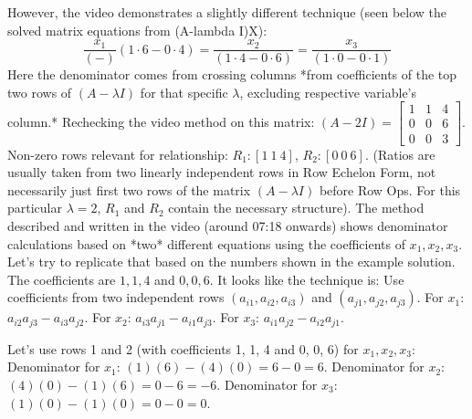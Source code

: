 \documentclass{article}
\begin{document}
However, the video demonstrates a slightly different technique (seen below the solved matrix equations from (A-lambda I)X):
\[ \frac{x_1}{ (-)}(1 \cdot 6 - 0 \cdot 4 ) = \frac{x_2}{(1 \cdot 4 - 0 \cdot 6 )} = \frac{x_3}{ (1 \cdot 0 - 0 \cdot 1 ) } \]
Here the denominator comes from crossing columns *from coefficients of the top two rows of $(A-\lambda I)$ for that specific $\lambda$, excluding respective variable's column.* Rechecking the video method on this matrix:
$(A-2I) = \begin{bmatrix} 1 & 1 & 4 \\ 0 & 0 & 6 \\ 0 & 0 & 3 \end{bmatrix}$. Non-zero rows relevant for relationship: $R_1: [1 \ 1 \ 4]$, $R_2: [0 \ 0 \ 6]$. (Ratios are usually taken from two linearly independent rows in Row Echelon Form, not necessarily just first two rows of the matrix $(A-\lambda I)$ before Row Ops. For this particular $\lambda=2$, $R_1$ and $R_2$ contain the necessary structure).
The method described and written in the video (around 07:18 onwards) shows denominator calculations based on *two* different equations using the coefficients of $x_1, x_2, x_3$. Let's try to replicate that based on the numbers shown in the example solution. The coefficients are $1, 1, 4$ and $0, 0, 6$.
It looks like the technique is: Use coefficients from two independent rows $(a_{i1}, a_{i2}, a_{i3})$ and $(a_{j1}, a_{j2}, a_{j3})$. For $x_1$: $a_{i2}a_{j3} - a_{i3}a_{j2}$. For $x_2$: $a_{i3}a_{j1} - a_{i1}a_{j3}$. For $x_3$: $a_{i1}a_{j2} - a_{i2}a_{j1}$.

Let's use rows 1 and 2 (with coefficients 1, 1, 4 and 0, 0, 6) for $x_1, x_2, x_3$:
Denominator for $x_1$: $(1)(6) - (4)(0) = 6 - 0 = 6$.
Denominator for $x_2$: $(4)(0) - (1)(6) = 0 - 6 = -6$.
Denominator for $x_3$: $(1)(0) - (1)(0) = 0 - 0 = 0$.
\end{document}
